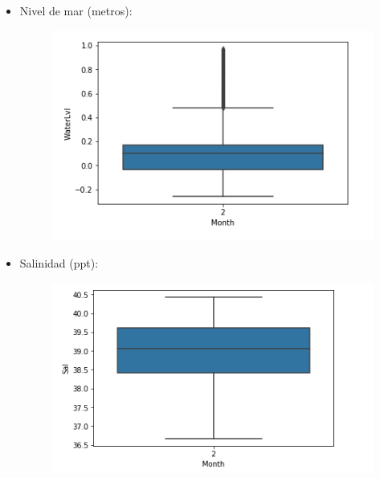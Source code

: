 \documentclass{article}
\begin{document}
\begin{itemize}
\item Nivel de mar (metros):
\begin{figure}[h!]
\centering
\includegraphics[width=0.4\linewidth]{wtrlvl.png}
\end{figure}

\item Salinidad (ppt):
\begin{figure}[h!]
\centering
\includegraphics[width=0.4\linewidth]{sal.png}
\end{figure}


\end{itemize}
\end{document}
